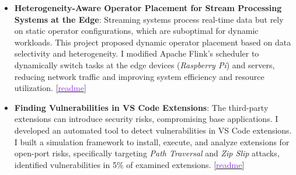 \begin{itemize}[topsep=0pt, itemsep=0pt, parsep=0.5pt]
  \item \textbf{Heterogeneity-Aware Operator Placement for Stream Processing Systems at the Edge}: Streaming systems process 
  real-time data but rely on static operator configurations, which are suboptimal for dynamic workloads. This project proposed 
  dynamic operator placement based on data selectivity and heterogeneity. I modified Apache Flink's scheduler to dynamically 
  switch tasks at the edge devices (\textit{Raspberry Pi}) and servers, reducing network traffic and improving system efficiency
   and resource utilization.
  \href{https://shubhamkaushik.com/projects/finding_vulnuerbilities_in_VS_Code_extensions/}{[\textcolor{blueviolet}{readme}]}


  \item \textbf{Finding Vulnerabilities in VS Code Extensions}: The third-party extensions can introduce security risks, 
  compromising base applications. I developed an automated tool to detect vulnerabilities in VS Code extensions. 
  I built a simulation framework to install, execute, and analyze extensions for open-port risks, specifically targeting 
  \textit{Path Traversal} and \textit{Zip Slip} attacks, identified vulnerabilities in 5\% of examined extensions.
  \href{https://shubhamkaushik.com/projects/heterogeneity_aware_operator_placement_for_stream_processing_systems_at_the_edge/}{[\textcolor{blueviolet}{readme}]}
\end{itemize}

